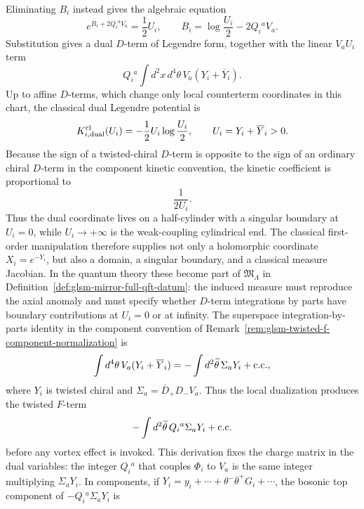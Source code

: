 Eliminating \(B_i\) instead gives the algebraic equation
\begin{equation}
  e^{B_i+2Q_i{}^aV_a}=\frac12 U_i ,
  \qquad
  B_i=\log\frac{U_i}{2}-2Q_i{}^aV_a .
  \label{eq:glsm-charged-chiral-b-equation}
\end{equation}
Substitution gives a dual \(D\)-term of Legendre form, together with the
linear \(V_aU_i\) term
\[
  Q_i{}^a\int d^2x\,d^4\theta\,V_a(Y_i+\overline Y_i).
\]
Up to affine \(D\)-terms, which change only local counterterm coordinates in
this chart, the classical dual Legendre potential is
\begin{equation}
  K_{i,{\rm dual}}^{\rm cl}(U_i)
  =
  -\frac12 U_i\log\frac{U_i}{2},
  \qquad
  U_i=Y_i+\overline Y_i>0 .
  \label{eq:glsm-charged-chiral-dual-classical-kahler}
\end{equation}
Because the sign of a twisted-chiral \(D\)-term is opposite to the sign of an
ordinary chiral \(D\)-term in the component kinetic convention, the kinetic
coefficient is proportional to
\[
  \frac1{2U_i}.
\]
Thus the dual coordinate lives on a half-cylinder with a singular boundary at
\(U_i=0\), while \(U_i\to+\infty\) is the weak-coupling cylindrical end.  The
classical first-order manipulation therefore supplies not only a holomorphic
coordinate \(X_i=e^{-Y_i}\), but also a domain, a singular boundary, and a
classical measure Jacobian.  In the quantum theory these become part of
\(\mathfrak M_\Lambda\) in
Definition~\ref{def:glsm-mirror-full-qft-datum}: the induced measure must
reproduce the axial anomaly and must specify whether \(D\)-term integrations by
parts have boundary contributions at \(U_i=0\) or at infinity.
The superspace integration-by-parts identity in the component convention of
Remark~\ref{rem:glsm-twisted-f-component-normalization} is
\begin{equation}
  \int d^4\theta\,V_a(Y_i+\overline Y_i)
  =
  -\int d^2\widetilde\theta\,\Sigma_aY_i
  +{\rm c.c.},
  \label{eq:glsm-dual-integration-by-parts}
\end{equation}
where \(Y_i\) is twisted chiral and
\(\Sigma_a=\overline D_+D_-V_a\).  Thus the local dualization produces the
twisted \(F\)-term
\[
  -\int d^2\widetilde\theta\,
  Q_i{}^a\Sigma_aY_i
  +{\rm c.c.}
\]
before any vortex effect is invoked.  This derivation fixes the charge
matrix in the dual variables: the integer \(Q_i{}^a\) that couples
\(\Phi_i\) to \(V_a\) is the same integer multiplying \(\Sigma_aY_i\).
In components, if \(Y_i=y_i+\cdots+\theta^-\overline\theta^+G_i+\cdots\),
the bosonic top component of \(-Q_i{}^a\Sigma_aY_i\) is
